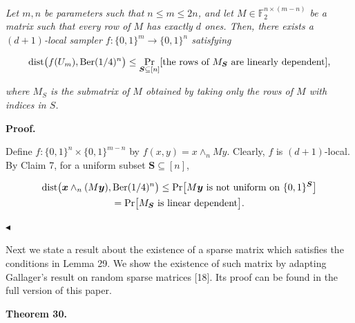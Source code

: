 \emph{Let $m,n$ be parameters such that $n\leq m\leq 2n$, and let $M\in\mathbb{F}_{2}^{n\times(m-n)}$ be a matrix such that every row of $M$ has exactly $d$ ones.
Then, there exists a $(d+1)$-local sampler $f\colon\{0,1\}^{m}\to\{0,1\}^{n}$ satisfying}\par


\[\begin{gathered}
\displaystyle\mathrm{dist}\bigl(f(U_{m}),\textnormal{Ber}(1/4)^{n}\bigr)\leq\Pr_{\boldsymbol{S}\subseteq[n]}[\text{the rows of $M_{\boldsymbol{S}}$ are linearly dependent}],
\end{gathered}\]


\emph{where $M_{S}$ is the submatrix of $M$ obtained by taking only the rows of $M$ with indices in $S$.}\par






\par\medskip\noindent\textbf{Proof.}\par




Define $f\colon\{0,1\}^{n}\times\{0,1\}^{m-n}$ by $f(x,y)=x\wedge_{n}My$.
Clearly, $f$ is $(d+1)$-local.
By Claim 7, for a uniform subset $\boldsymbol{S}\subseteq[n]$,\par


\[\begin{gathered}
\displaystyle\mathrm{dist}\bigl(\boldsymbol{x}\wedge_{n}(M\boldsymbol{y}),\textnormal{Ber}(1/4)^{n}\bigr) \displaystyle\leq\Pr\bigl[\text{$M\boldsymbol{y}$ is not uniform on $\{0,1\}^{\boldsymbol{S}}$}\bigr] \\
\displaystyle=\Pr\bigl[\text{$M_{\boldsymbol{S}}$ is linear dependent}\bigr].
\end{gathered}\]


$\blacktriangleleft$\par




Next we state a result about the existence of a sparse matrix which satisfies the conditions in Lemma 29.
We show the existence of such matrix by adapting Gallager’s result on random sparse matrices [18].
Its proof can be found in the full version of this paper.\par





\par\medskip\noindent\textbf{
\textbf{Theorem 30}\textbf{.}
}\par




